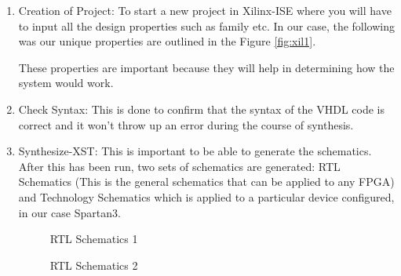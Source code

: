 \documentclass[12pt]{article}
\begin{document}
\begin{enumerate}
  \item Creation of Project: To start a new project in Xilinx-ISE where you will have to input all the design properties such as family etc. In our case, the following was our unique properties are outlined in the Figure \ref{fig:xil1}. 

  
  These properties are important because they will help in determining how the system would work. 
  
  \item Check Syntax: This is done to confirm that the syntax of the VHDL code is correct and it won't throw up an error during the course of synthesis.
  
  \item Synthesize-XST: This is important to be able to generate the schematics. After this has been run, two sets of schematics are generated: RTL Schematics (This is the general schematics that can be applied to any FPGA) and Technology Schematics which is applied to a particular device configured, in our case Spartan3.
  
\begin{figure}[H]
\caption{RTL Schematics 1}
\label{fig:xil2}
\end{figure}
  
\begin{figure}[H]
\caption{RTL Schematics 2}
\label{fig:xil3}
\end{figure}  


\end{enumerate}
\end{document}
